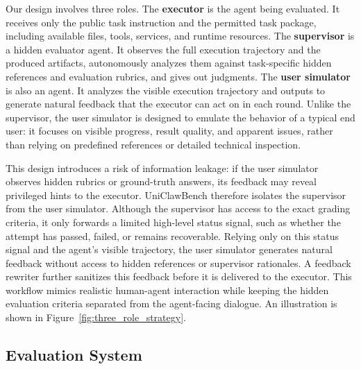 Our design involves three roles. The \textbf{executor} is the agent being evaluated. It receives only the public task instruction and the permitted task package, including available files, tools, services, and runtime resources. The \textbf{supervisor} is a hidden evaluator agent. It observes the full execution trajectory and the produced artifacts, autonomously analyzes them against task-specific hidden references and evaluation rubrics, and gives out judgments.
The \textbf{user simulator} is also an agent.
It analyzes the visible execution trajectory and outputs to generate natural feedback that the executor can act on in each round. Unlike the supervisor, the user simulator is designed to emulate the behavior of a typical end user: it focuses on visible progress, result quality, and apparent issues, rather than relying on predefined references or detailed technical inspection. 


This design introduces a risk of information leakage: if the user simulator observes hidden rubrics or ground-truth answers, its feedback may reveal privileged hints to the executor. UniClawBench therefore isolates the supervisor from the user simulator. Although the supervisor has access to the exact grading criteria, it only forwards a limited high-level status signal, such as whether the attempt has passed, failed, or remains recoverable. Relying only on this status signal and the agent's visible trajectory, the user simulator generates natural feedback without access to hidden references or supervisor rationales. A feedback rewriter further sanitizes this feedback before it is delivered to the executor. This workflow
mimics realistic human-agent interaction while keeping the hidden evaluation criteria separated from the agent-facing dialogue. An illustration is shown in Figure~\ref{fig:three_role_strategy}.
\vspace{-5pt}
\subsection{Evaluation System}
\label{sec:eval-system}




